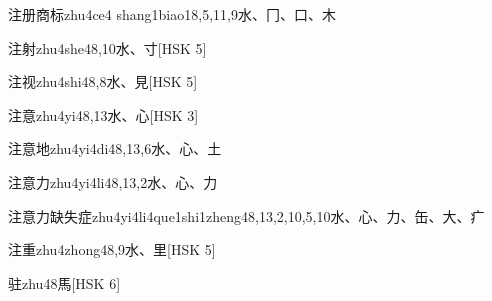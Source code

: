 \begin{EntryWithPhonetic}{注册商标}{zhu4ce4 shang1biao1}{8,5,11,9}{⽔、⼌、⼝、⽊}
\end{EntryWithPhonetic}

\begin{EntryWithPhonetic}{注射}{zhu4she4}{8,10}{⽔、⼨}[HSK 5]
\end{EntryWithPhonetic}

\begin{EntryWithPhonetic}{注视}{zhu4shi4}{8,8}{⽔、⾒}[HSK 5]
\end{EntryWithPhonetic}

\begin{EntryWithPhonetic}{注意}{zhu4yi4}{8,13}{⽔、⼼}[HSK 3]
\end{EntryWithPhonetic}

\begin{EntryWithPhonetic}{注意地}{zhu4yi4di4}{8,13,6}{⽔、⼼、⼟}
\end{EntryWithPhonetic}

\begin{EntryWithPhonetic}{注意力}{zhu4yi4li4}{8,13,2}{⽔、⼼、⼒}
\end{EntryWithPhonetic}

\begin{EntryWithPhonetic}{注意力缺失症}{zhu4yi4li4que1shi1zheng4}{8,13,2,10,5,10}{⽔、⼼、⼒、⽸、⼤、⽧}
\end{EntryWithPhonetic}

\begin{EntryWithPhonetic}{注重}{zhu4zhong4}{8,9}{⽔、⾥}[HSK 5]
\end{EntryWithPhonetic}

\begin{EntryWithPhonetic}{驻}{zhu4}{8}{⾺}[HSK 6]
\end{EntryWithPhonetic}

